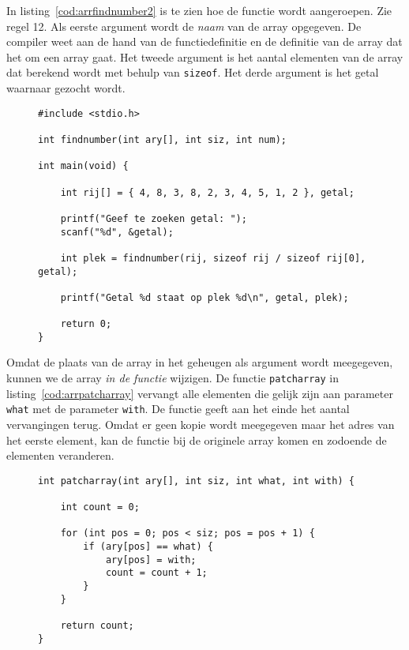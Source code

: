 In listing~\ref{cod:arrfindnumber2} is te zien hoe de functie wordt aangeroepen. Zie regel 12. Als eerste argument wordt de \textsl{naam} van de array opgegeven. De compiler weet aan de hand van de functiedefinitie en de definitie van de array dat het om een array gaat. Het tweede argument is het aantal elementen van de array dat berekend wordt met behulp van  \texttt{sizeof}. Het derde argument is het getal waarnaar gezocht wordt.

\begin{figure}[!ht]
\begin{lstlisting}[caption=Aanroepen van de functie \texttt{findnumber}.,label=cod:arrfindnumber2]
#include <stdio.h>

int findnumber(int ary[], int siz, int num);

int main(void) {

    int rij[] = { 4, 8, 3, 8, 2, 3, 4, 5, 1, 2 }, getal;

    printf("Geef te zoeken getal: ");
    scanf("%d", &getal);
    
    int plek = findnumber(rij, sizeof rij / sizeof rij[0], getal);

    printf("Getal %d staat op plek %d\n", getal, plek);

    return 0;
}
\end{lstlisting}
\end{figure}

Omdat de plaats van de array in het geheugen als argument wordt meegegeven, kunnen we de array \textsl{in de functie} wijzigen. De functie \texttt{patcharray} in listing~\ref{cod:arrpatcharray} vervangt alle elementen die gelijk zijn aan parameter \texttt{what} met de parameter \texttt{with}. De functie geeft aan het einde het aantal vervangingen terug. Omdat er geen kopie wordt meegegeven maar het adres van het eerste element, kan de functie bij de originele array komen en zodoende de elementen veranderen.

\begin{figure}[!ht]
\begin{lstlisting}[caption=Functie om een getal te vervangen door een ander getal.,label=cod:arrpatcharray]
int patcharray(int ary[], int siz, int what, int with) {

    int count = 0;

    for (int pos = 0; pos < siz; pos = pos + 1) {
        if (ary[pos] == what) {
            ary[pos] = with;
            count = count + 1;
        }
    }
    
    return count;
}
\end{lstlisting}
\end{figure}

